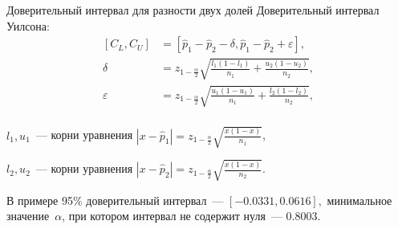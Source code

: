 \documentclass[9pt,pdf,utf8,hyperref={unicode},aspectratio=169]{beamer}
\begin{document}
\begin{frame}{Доверительный интервал для разности двух долей}
    Доверительный интервал Уилсона:
    \begin{align*}
        \left[C_L, C_U\right] &= \left[\hat{p}_1-\hat{p}_2 - \delta, \hat{p}_1-\hat{p}_2 + \varepsilon\right], \\
        \delta                &= z_{1-\frac{\alpha}{2}} \sqrt{\frac{l_1\left(1-l_1\right)}{n_1} + \frac{u_2\left(1-u_2\right)}{n_2}}, \\
        \varepsilon           &= z_{1-\frac{\alpha}{2}} \sqrt{\frac{u_1\left(1-u_1\right)}{n_1} + \frac{l_2\left(1-l_2\right)}{n_2}}, \\
    \end{align*}

    \vspace{-5pt}

    $l_1, u_1$~--- корни уравнения $\left|x-\hat{p}_1\right| = z_{1-\frac{\alpha}{2}} \sqrt{\frac{x\left(1-x\right)}{n_1}}$,

    $l_2, u_2$~--- корни уравнения $\left|x-\hat{p}_2\right| = z_{1-\frac{\alpha}{2}} \sqrt{\frac{x\left(1-x\right)}{n_2}}$.

    \bigskip

    В примере 95\% доверительный интервал~--- $[-0.0331, 0.0616],$ минимальное значение~$\alpha$, при котором интервал не содержит нуля~---  $0.8003$.
\end{frame}
\end{document}
